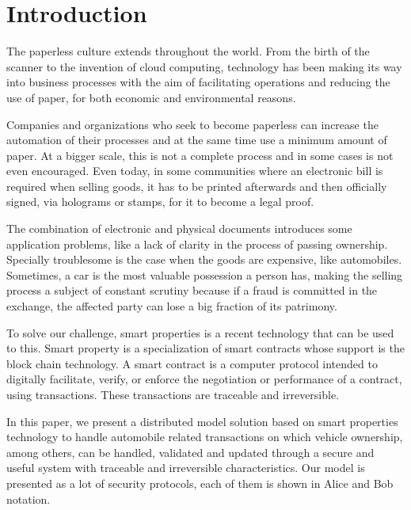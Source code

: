 \section{Introduction}
The paperless culture extends throughout the world. 
From the birth of the scanner to the invention of cloud computing, 
technology has been making its way into business processes 
with the aim of facilitating operations and reducing the use of paper, 
for both economic and environmental reasons. 

Companies and organizations who seek to become paperless can increase the automation of their processes and at the same time use a minimum amount of paper.
At a bigger scale, this is not a complete process and in some cases is not even encouraged.
Even today, 
in some communities where an electronic bill is required when selling goods, 
it has to be printed afterwards and then officially signed, 
via holograms or stamps, 
for it to become a legal proof. 

The combination of electronic and physical documents introduces some application problems, 
like a lack of clarity in the process of passing ownership.
Specially troublesome is the case when the goods are expensive, like automobiles.
Sometimes, a car is the most valuable possession a person has, 
making the selling process a subject of constant scrutiny 
because if a fraud is committed in the exchange, 
the affected party can lose a big fraction of its patrimony.

To solve our challenge, smart properties is a recent
technology that can be used to this. Smart property is a specialization of 
smart contracts whose support is the block chain technology.
A smart contract is a computer protocol intended to digitally facilitate,
verify, or enforce the negotiation or performance of a
contract, using transactions. These transactions are traceable
and irreversible.


In this paper, 
we present a distributed model solution based on smart properties technology 
to handle automobile related transactions on which vehicle ownership, 
among others, can be handled, validated and updated through a 
secure and useful system with traceable and irreversible characteristics. 
Our model is presented as a lot of security protocols, each of them is shown
in Alice and Bob notation.


